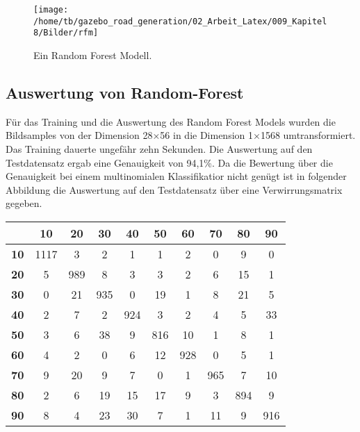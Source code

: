 {{{{{{{{\begin{figure}[H]
\begin{center}
  \texttt{[image: /home/tb/gazebo\_road\_generation/02\_Arbeit\_Latex/009\_Kapitel8/Bilder/rfm]}%
  \caption[Ein Random Forest Modell]%
           {\label{fig:Ein Random Forest Modell}%
           Ein Random Forest Modell.
           }
\end{center}
\end{figure}

\subsection{Auswertung von Random-Forest}
\label{subsec:Auswertung von Random-Forest}


F\"ur das Training und die Auswertung des Random Forest Models wurden die Bildsamples von der Dimension 28$\times$56 in die Dimension 1$\times$1568 umtransformiert.
Das Training dauerte ungef{\"a}hr zehn Sekunden.
Die Auswertung auf den Testdatensatz ergab eine Genauigkeit von 94,1\%.
Da die Bewertung \"uber die Genauigkeit bei einem multinomialen Klassifikatior nicht gen\"ugt ist in folgender Abbildung die Auswertung auf den Testdatensatz \"uber eine Verwirrungsmatrix gegeben.

\begin{center}


\begin{tabular}{|c|c|c|c|c|c|c|c|c|c|}
\hline
    & \textbf{10} & \textbf{20} & \textbf{30} & \textbf{40} & \textbf{50} & \textbf{60} & \textbf{70} & \textbf{80} & \textbf{90} \\
\hline
\textbf{10} & 1117 &  3 &  2 &  1 &  1 &  2 &  0 &  9 &  0 \\
\hline
\textbf{20} &  5  & 989 &   8 &   3 &   3 &   2 &   6 &  15 &   1 \\
\hline
\textbf{30} & 0  & 21 & 935  &  0 &  19 &   1 &   8 &  21 &   5 \\
\hline 
\textbf{40} &  2 &   7 &   2 & 924  &  3  &  2 &   4  &  5 &  33 \\
\hline 
\textbf{50} &  3 &   6 &  38 &   9 & 816 &  10 &   1 &   8 &   1 \\
\hline 
\textbf{60} &  4  &  2 &   0 &   6 &  12 & 928 &   0  &  5 &   1 \\
\hline 
\textbf{70} &  9  & 20 &   9 &   7 &   0  &  1 & 965  &  7 &  10 \\
\hline 
\textbf{80} &  2  &  6 &  19 &  15 &  17 &   9  &  3 & 894  &  9 \\
\hline
\textbf{90} &  8  &  4 &  23 &  30 &   7 &   1 &  11 &   9 & 916 \\
\hline
\end{tabular}


\end{center}}}}}}}}}

